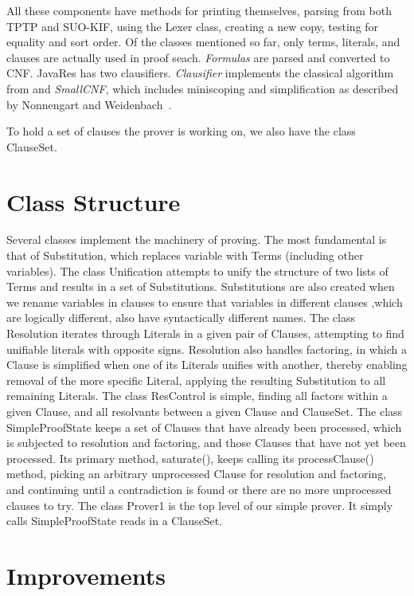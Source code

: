 \documentclass{llncs}
\begin{document}
All these components have methods for printing themselves, parsing
from both TPTP and SUO-KIF, using the Lexer class, creating a new
copy, testing for equality and sort order. Of the classes mentioned so
far, only terms, literals, and clauses are actually used in proof
seach.  \emph{Formulas} are parsed and converted to CNF.  JavaRes has
two clausifiers. \emph{Clausifier} implements the classical algorithm
from \cite{RN:AI-95} and \emph{SmallCNF}, which includes miniscoping
and simplification as described by Nonnengart and
Weidenbach~\cite{NW:SmallCNF-2001}.

To hold a set of clauses the prover is working on, we also have the
class ClauseSet.

\section{Class Structure}

Several classes implement the machinery of proving.  The most
fundamental is that of Substitution, which replaces variable with
Terms (including other variables).  The class Unification attempts to
unify the structure of two lists of Terms and results in a set of
Substitutions.  Substitutions are also created when we rename
variables in clauses to ensure that variables in different clauses
,which are logically different, also have syntactically different
names.  The class Resolution iterates through Literals in a given pair
of Clauses, attempting to find unifiable literals with opposite signs.
Resolution also handles factoring, in which a Clause is simplified
when one of its Literals unifies with another, thereby enabling
removal of the more specific Literal, applying the resulting
Substitution to all remaining Literals.  The class ResControl is
simple, finding all factors within a given Clause, and all resolvants
between a given Clause and ClauseSet.  The class SimpleProofState
keeps a set of Clauses that have already been processed, which is
subjected to resolution and factoring, and those Clauses that have not
yet been processed.  Its primary method, saturate(), keeps calling its
processClause() method, picking an arbitrary unprocessed Clause for
resolution and factoring, and continuing until a contradiction is
found or there are no more unprocessed clauses to try.  The class
Prover1 is the top level of our simple prover.  It simply calls
SimpleProofState reads in a ClauseSet.

\section{Improvements}
\end{document}
